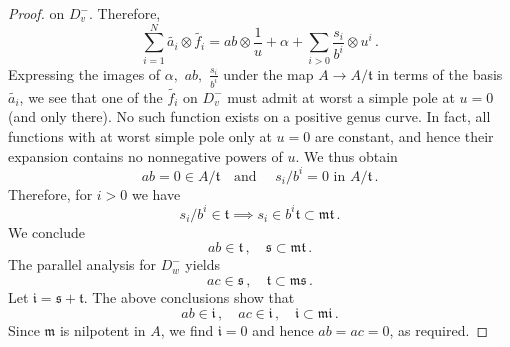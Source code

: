 \documentclass[11pt]{amsart}
\theoremstyle{definition}
\renewcommand{\tilde}{\widetilde}
\begin{document}
{\begin{proof}
on $D_v^-$. Therefore, $$\sum_{i=1}^{N} \tilde{a_i}\otimes \tilde {f_i}=ab\otimes \frac{1}{u}+ \alpha+\sum_{i>0} \frac{s_i}{b^i}\otimes u^i\,.$$ Expressing the images of $\alpha,$ $ab,$ $\frac{s_i}{b^i}$ under the map $A\to A/\mathfrak t$ in terms of the basis $\tilde {a_i}$, we see that one of the $\tilde{f_i}$ on $D_v^-$ must admit at worst a simple pole at $u=0$ (and only there). No such function exists on a positive genus curve. In fact, all functions with at worst simple pole only at $u=0$ are constant, and hence their expansion contains no nonnegative powers of $u$. We thus obtain \begin{equation}\label{keyred1}ab=0 \in   A/\mathfrak t \quad \text{and } \quad s_i/b^i=0 \text{ in }A/\mathfrak t\,.\end{equation} Therefore, for $i>0$  we have $$s_i/b^i\in \mathfrak t\implies s_i\in b^i\mathfrak t\subset \mathfrak m \mathfrak t\,.$$ We conclude $$ab\in \mathfrak t\, , \quad \mathfrak s\subset \mathfrak m\mathfrak t\,.$$ The parallel analysis for $D_w^-$ yields $$ac\in \mathfrak s\, , \quad \mathfrak t\subset \mathfrak m \mathfrak s\,.$$ 
Let $\mathfrak i=\mathfrak s+\mathfrak t$. 
The above conclusions show that $$ab\in \mathfrak i\, , \quad ac\in \mathfrak i\, , \quad \mathfrak i\subset \mathfrak m \mathfrak i\,.$$ Since $\mathfrak m$ is nilpotent in $A$, we find $\mathfrak i=0$ and hence $ab=ac=0$, as required. 






\end{proof}}
\end{document}

